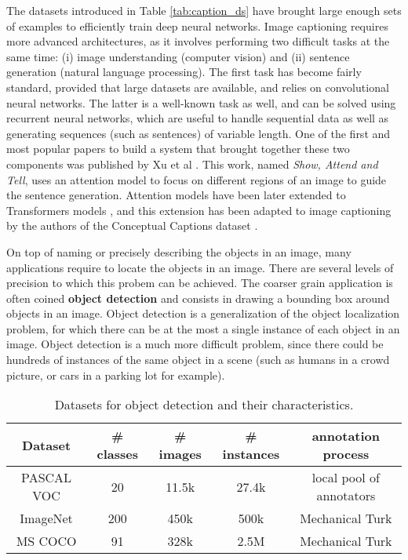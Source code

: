 The datasets introduced in Table \ref{tab:caption_ds} have brought large enough sets of examples to efficiently train deep neural networks. Image captioning requires more advanced architectures, as it involves performing two difficult tasks at the same time: (i) image understanding (computer vision) and (ii) sentence generation (natural language processing). The first task has become fairly standard, provided that large datasets are available, and relies on convolutional neural networks. The latter is a well-known task as well, and can be solved using recurrent neural networks, which are useful to handle sequential data as well as generating sequences (such as sentences) of variable length. One of the first and most popular papers to build a system that brought together these two components was published by Xu et al \cite{xu2015show}. This work, named \textit{Show, Attend and Tell}, uses an attention model to focus on different regions of an image to guide the sentence generation. Attention models have been later extended to Transformers models \cite{vaswani2017attention}, and this extension has been adapted to image captioning by the authors of the Conceptual Captions dataset \cite{sharma-etal-2018-conceptual}.


On top of naming or precisely describing the objects in an image, many applications require to locate the objects in an image. There are several levels of precision to which this probem can be achieved. The coarser grain application is often coined \textbf{object detection} and consists in drawing a bounding box around objects in an image. Object detection is a generalization of the object localization problem, for which there can be at the most a single instance of each object in an image. Object detection is a much more difficult problem, since there could be hundreds of instances of the same object in a scene (such as humans in a crowd picture, or cars in a parking lot for example).

\vspace{0.5cm}

\begin{table}
	\centering
	\caption{Datasets for object detection and their characteristics.}
	\begin{tabular}{|c|c|c|c|c|}
		\hline
		Dataset & \# classes & \# images & \# instances & annotation process \\
		\hline
		PASCAL VOC \cite{Everingham10} & 20 & 11.5k & 27.4k & local pool of annotators \\
		ImageNet\cite{ILSVRC15} & 200 & 450k & 500k & Mechanical Turk \\
		MS COCO \cite{chen2015microsoft} & 91 & 328k & 2.5M & Mechanical Turk \\
		\hline
	\end{tabular}
	\label{tab:detection_ds}
\end{table}
\vspace{0.5cm}

